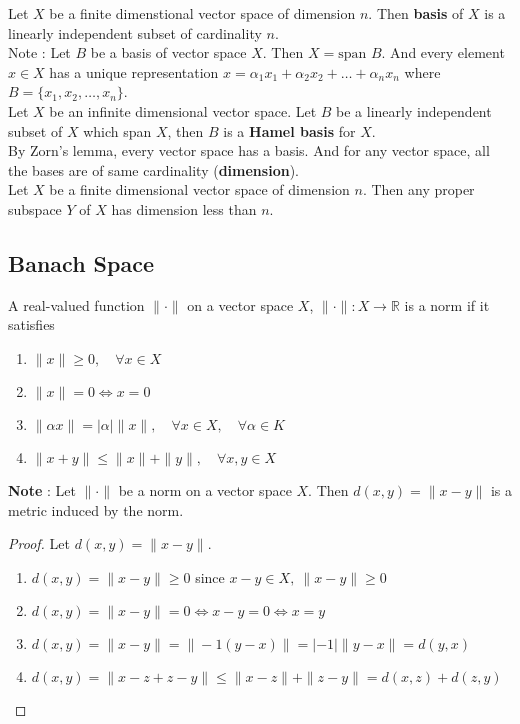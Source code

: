 Let $X$ be a finite dimenstional vector space of dimension $n$.
Then \textbf{basis} of $X$ is a linearly independent subset of cardinality $n$.\\
Note : Let $B$ be a basis of vector space $X$. Then $X = \text{span }B$.
And every element $x \in X$ has a unique representation $x = \alpha_1 x_1 + \alpha_2 x_2 + \dots + \alpha_n x_n$ where $B = \{ x_1,x_2,\dots,x_n \}$.\\

Let $X$ be an infinite dimensional vector space.
Let $B$ be a linearly independent subset of $X$ which span $X$, then $B$ is a \textbf{ Hamel basis} for $X$.\\

By Zorn's lemma, every vector space has a basis.
And for any vector space, all the bases are of same cardinality (\textbf{dimension}).\\

Let $X$ be a finite dimensional vector space of dimension $n$.
Then any proper subspace $Y$ of $X$ has dimension less than $n$.

\subsection{Banach Space}
\begin{definition}[norm]
	A real-valued function $\| \cdot \|$ on a vector space $X$, $\| \cdot \| : X \to \mathbb{R}$ is a norm if it satisfies
	\begin{enumerate}
		\item $\| x \| \ge 0,\quad \forall x \in X$
		\item $\| x \| = 0 \iff x = 0$
		\item $\| \alpha x \| = |\alpha| \| x \|,\quad \forall x \in X,\quad \forall \alpha \in K$
		\item $\| x + y \| \le \| x \| + \| y \|,\quad \forall x,y \in X$
	\end{enumerate}
\end{definition}

\textbf{Note} : Let $\| \cdot \|$ be a norm on a vector space $X$.
Then $d(x,y) = \| x -y\|$ is a metric induced by the norm.
\begin{proof}
	Let $d(x,y) = \| x-y \|$.
	\begin{enumerate}
		\item $d(x,y) = \| x-y \| \ge 0$ since $x-y \in X,\ \| x-y \| \ge 0$
		\item $d(x,y) = \| x-y \| = 0 \iff x-y = 0 \iff x = y$
		\item $d(x,y) = \| x-y \| = \| -1(y-x) \| = |-1|\|y-x\| = d(y,x)$
		\item $d(x,y) = \| x -z +z-y\| \le \|x-z\| + \| z-y\| = d(x,z) + d(z,y)$
	\end{enumerate}
\end{proof}

